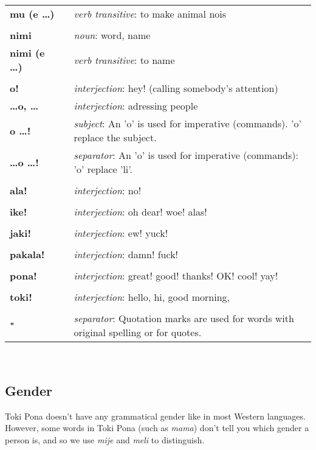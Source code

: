 \begin{supertabular}{p{2,5cm}|ll}
\textbf{mu (e \dots)} && \textit{verb transitive}: to make animal nois \\ %
 && \\ %
\textbf{nimi} && \textit{noun}: word, name \\ %
\textbf{nimi (e \dots )} && \textit{verb transitive}: to name \\ %
 && \\ %
\textbf{o!} && \textit{interjection}: hey! (calling somebody's attention) \\ %
\textbf{\dots o, \dots} && \textit{interjection}: adressing people \\ %
\textbf{o \dots !} && \textit{subject}: An 'o' is used for imperative (commands). 'o' replace the subject.  \\ %
\textbf{\dots o \dots !} && \textit{separator}: An 'o' is used for imperative (commands): 'o' replace 'li'. \\ %
 && \\ %
\textbf{ala!} && \textit{interjection}: no! \\ %
 && \\ %
\textbf{ike!} && \textit{interjection}: oh dear! woe! alas! \\ %
 && \\ %
\textbf{jaki!} && \textit{interjection}: ew! yuck! \\ %
 && \\ %
\textbf{pakala!} && \textit{interjection}: damn! fuck! \\ %
 && \\ %
\textbf{pona!} && \textit{interjection}: great! good! thanks! OK! cool! yay! \\ %
 && \\ %
\textbf{toki!} && \textit{interjection}: hello, hi, good morning, \\ %
 && \\ %
\textbf{"} && \textit{separator}: Quotation marks are used for words with original spelling or for quotes. \\ %
\end{supertabular} \\
%
\subsection*{Gender}
%
Toki Pona doesn't have any grammatical gender like in most Western languages.  
However, some words in Toki Pona (such as \textit{mama}) don't tell you which gender a person is, and so we use \textit{mije} and \textit{meli} to distinguish. 


